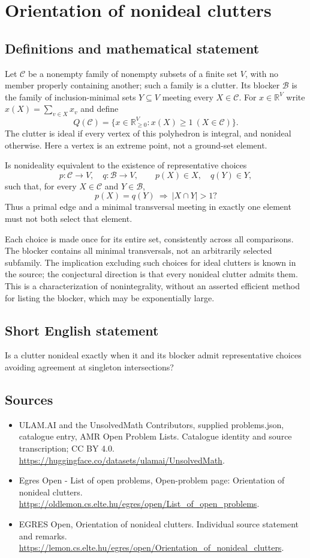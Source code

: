 \documentclass[11pt,a4paper]{article}
\begin{document}
\section*{Orientation of nonideal clutters}\label{statement}

\subsection{Definitions and mathematical statement}
Let $\mathcal C$ be a nonempty family of nonempty subsets of a finite
set $V$, with no member properly containing another; such a family is
a clutter. Its blocker $\mathcal B$ is the family of inclusion-minimal
sets $Y\subseteq V$ meeting every $X\in\mathcal C$.
For $x\in\mathbb R^V$ write $x(X)=\sum_{v\in X}x_v$ and define
\[
 Q(\mathcal C)=\{x\in\mathbb R_{\ge0}^V:
                              x(X)\ge1\ (X\in\mathcal C)\}.
\]
The clutter is ideal if every vertex of this polyhedron is integral,
and nonideal otherwise. Here a vertex is an extreme point, not a
ground-set element.

Is nonideality equivalent to the existence of representative choices
\[
 p:\mathcal C\to V,\quad q:\mathcal B\to V,
 \qquad p(X)\in X,\quad q(Y)\in Y,
\]
such that, for every $X\in\mathcal C$ and $Y\in\mathcal B$,
\[
                   p(X)=q(Y)\ \Longrightarrow\ |X\cap Y|>1?
\]
Thus a primal edge and a minimal transversal meeting in exactly one
element must not both select that element.

Each choice is made once for its entire set, consistently across all
comparisons. The blocker contains all minimal transversals, not an
arbitrarily selected subfamily. The implication excluding such choices
for ideal clutters is known in the source; the conjectural direction
is that every nonideal clutter admits them. This is a characterization
of nonintegrality, without an asserted efficient method for listing
the blocker, which may be exponentially large.
\subsection{Short English statement}
Is a clutter nonideal exactly when it and its blocker admit representative choices avoiding agreement at singleton intersections?
\subsection{Sources}
\begin{itemize}
\item[S1] ULAM.AI and the UnsolvedMath Contributors, supplied problems.json, catalogue entry, AMR Open Problem Lists. Catalogue identity and source transcription; CC BY 4.0.
\url{https://huggingface.co/datasets/ulamai/UnsolvedMath}.
\item[S2] Egres Open - List of open problems, Open-problem page: Orientation of nonideal clutters. 
\url{https://oldlemon.cs.elte.hu/egres/open/List_of_open_problems}.
\item[S3] EGRES Open, Orientation of nonideal clutters. Individual source statement and remarks.
\url{https://lemon.cs.elte.hu/egres/open/Orientation_of_nonideal_clutters}.
\end{itemize}
\end{document}
